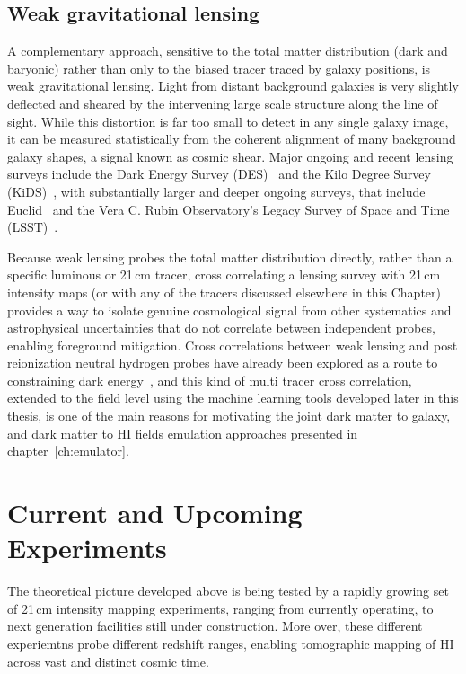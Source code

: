 \subsection{Weak gravitational lensing}

A complementary approach, sensitive to the total matter distribution (dark and baryonic) rather than only to the biased tracer traced by galaxy positions, is weak gravitational lensing. Light from distant background galaxies is very slightly deflected and sheared by the intervening large scale structure along the line of sight. While this distortion is far too small to detect in any single galaxy image, it can be measured statistically from the coherent alignment of many background galaxy shapes, a signal known as cosmic shear. Major ongoing and recent lensing surveys include the Dark Energy Survey (DES)~\citep{abbott:2018} and the Kilo Degree Survey (KiDS)~\citep{Hildebrandt:2017}, with substantially larger and deeper ongoing surveys, that include Euclid~\citep{Euclid:2019clj,euclid_collaboration_et_al_euclid_2020,scaramella_euclid_2022} and the Vera C. Rubin Observatory's Legacy Survey of Space and Time (LSST)~\citep{Ivezic_2019}.

Because weak lensing probes the total matter distribution directly, rather than a specific luminous or 21\,cm tracer, cross correlating a lensing survey with 21\,cm intensity maps (or with any of the tracers discussed elsewhere in this Chapter) provides a way to isolate genuine cosmological signal from other systematics and astrophysical uncertainties that do not correlate between independent probes, enabling foreground mitigation. Cross correlations between weak lensing and post reionization neutral hydrogen probes have already been explored as a route to constraining dark energy~\citep{Dash:2020}, and this kind of multi tracer cross correlation, extended to the field level using the machine learning tools developed later in this thesis, is one of the main reasons for motivating the joint dark matter to galaxy, and dark matter to HI fields emulation approaches presented in chapter~\ref{ch:emulator}.

\section{Current and Upcoming Experiments}
\label{sec:experiments}

The theoretical picture developed above is being tested by a rapidly growing set of 21\,cm intensity mapping experiments, ranging from currently operating, to next generation facilities still under construction. More over, these different experiemtns probe different redshift ranges, enabling tomographic mapping of HI across vast and distinct cosmic time.

